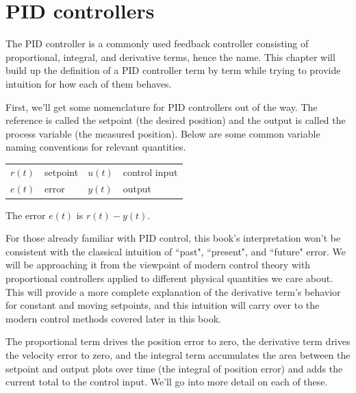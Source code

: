 
\chapter{PID controllers}

The PID controller is a commonly used feedback controller consisting of
proportional, integral, and derivative terms, hence the name. This chapter will
build up the definition of a PID controller term by term while trying to provide
intuition for how each of them behaves.

First, we'll get some nomenclature for PID controllers out of the way. The
\gls{reference} is called the \gls{setpoint} (the desired position) and the
\gls{output} is called the \gls{process variable} (the measured position). Below
are some common variable naming conventions for relevant quantities.
\begin{figurekey}
  \begin{tabular}{llll}
    $r(t)$ & \Gls{setpoint} & $u(t)$ & \Gls{control input} \\
    $e(t)$ & \Gls{error} & $y(t)$ & \Gls{output}
  \end{tabular}
\end{figurekey}

The \gls{error} $e(t)$ is $r(t) - y(t)$.

For those already familiar with PID control, this book's interpretation won't be
consistent with the classical intuition of ``past", ``present", and ``future"
error. We will be approaching it from the viewpoint of modern control theory
with proportional controllers applied to different physical quantities we care
about. This will provide a more complete explanation of the derivative term's
behavior for constant and moving \glspl{setpoint}, and this intuition will carry
over to the modern control methods covered later in this book.

The proportional term drives the position error to zero, the derivative term
drives the velocity error to zero, and the integral term accumulates the area
between the \gls{setpoint} and \gls{output} plots over time (the integral of
position \gls{error}) and adds the current total to the \gls{control input}.
We'll go into more detail on each of these.

\renewcommand*{\chapterpath}{\partpath/pid-controllers}








